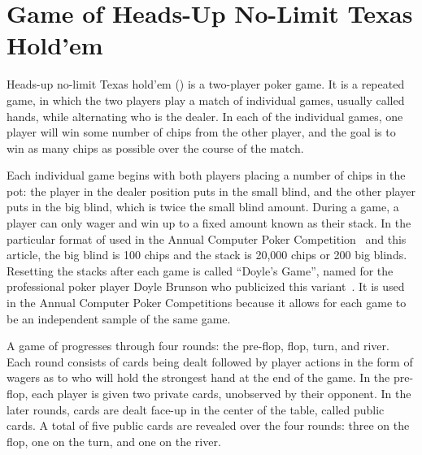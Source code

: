 \renewcommand{\topfraction}{.85}
\renewcommand{\bottomfraction}{.7}
\renewcommand{\textfraction}{.15}
\renewcommand{\floatpagefraction}{.66}
\renewcommand{\dbltopfraction}{.66}
\renewcommand{\dblfloatpagefraction}{.66}
\setcounter{topnumber}{9}
\setcounter{bottomnumber}{9}
\setcounter{totalnumber}{20}
\setcounter{dbltopnumber}{9}

\section*{Game of Heads-Up No-Limit Texas Hold'em}
Heads-up no-limit Texas hold'em (\HUNL{}) is a two-player poker game. It is a repeated game, in which the
two players play a match of individual games, usually called hands,
while alternating
who is the dealer. In each of the individual games, one player will win some number of chips
from the other player, and the goal is to win as many chips as possible over the course of the
match.  

Each individual game begins with both players placing a number of chips in the pot: the
player in the dealer position puts in the small blind, and the other player puts in the big blind,
which is twice the small blind amount.   
During a game, a player can only wager and win up to a fixed amount known as their stack.  In the
particular format of \HUNL{} used in the Annual Computer Poker Competition~\cite{ZinkevichLittman06} and this article, the big blind is 100 chips and the stack is 20,000 chips or 200 big blinds.
Resetting the stacks after each game is called ``Doyle's Game'', named for the
professional poker player Doyle Brunson who
publicized this variant~\cite{Gilpin08:Tartanian}.  It is used in the Annual Computer Poker Competitions because it allows for each game to be an independent sample of the same game.

A game of \HUNL{} progresses through four rounds: the
pre-flop, flop, turn, and river. Each round consists of cards being dealt followed by player
actions in the form of wagers as to who will hold the strongest hand at the end of the game. In
the pre-flop, each player is given two private cards, unobserved by their opponent. In the later
rounds, cards are dealt face-up in the center of the table, called public cards. A total of five
public cards are revealed over the four rounds: three on the flop, one on the turn, and one
on the river.


